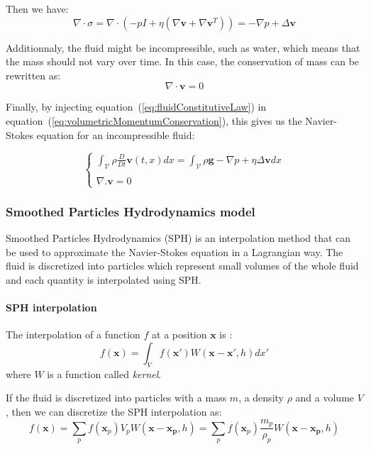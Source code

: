Then we have:
\begin{equation}
\nabla \cdot \sigma = \nabla \cdot \left( -pI + \eta \left( \nabla \mathbf{v} + \nabla \mathbf{v}^{T} \right) \right) = -\nabla p + \Delta \mathbf{v}
\end{equation}

Additionnaly, the fluid might be incompressible, such as water, which means that the mass should not vary over time. In this case, the conservation of mass can be rewritten as:
\begin{equation}
\nabla \cdot \mathbf{v} = 0
\end{equation}

Finally, by injecting equation~(\ref{eq:fluidConstitutiveLaw}) in equation~(\ref{eq:volumetricMomentumConservation}), this gives us the Navier-Stokes equation for an incompressible fluid:

\begin{equation}
\left\lbrace
\begin{array}{ll}
\displaystyle
\int_{\mathcal{V}} \rho \frac{D}{Dt} \mathbf{v}(t,x) dx = 
\int_{\mathcal{V}} \rho \mathbf{g} -\nabla p + \eta \Delta \mathbf{v} dx \\ \\
\displaystyle
\nabla. \mathbf{v} = 0
\end{array}
\right.
\end{equation}

\subsubsection{Smoothed Particles Hydrodynamics model}
Smoothed Particles Hydrodynamics (SPH) is an interpolation method that can be used to approximate the Navier-Stokes equation in a Lagrangian way. The fluid is discretized into particles which represent small volumes of the whole fluid and each quantity is interpolated using SPH.

\paragraph{SPH interpolation}
The interpolation of a function $f$ at a position $\mathbf{x}$ is :
\begin{equation}
f(\mathbf{x}) = \int_{V} f(\mathbf{x'})W(\mathbf{x}-\mathbf{x'}, h)dx'
\end{equation}
where $W$ is a function called \emph{kernel}. 

If the fluid is discretized into particles with a mass $m$, a density $\rho$ and a volume $V$, then we can discretize the SPH interpolation as:
\begin{equation}
f(\mathbf{x}) = \sum_{p} f(\mathbf{x}_{p})V_{p} W(\mathbf{x}-\mathbf{x_{p}},h) = \sum_{p} f(\mathbf{x}_{p})\frac{m_{p}}{\rho_{p}} W(\mathbf{x}-\mathbf{x_{p}},h)
\end{equation}

